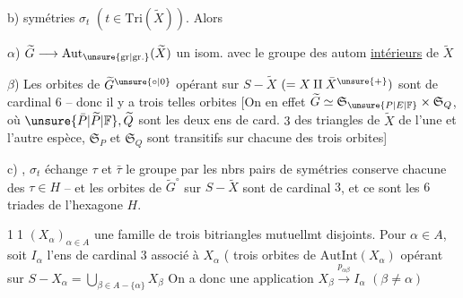 
b) 
 symétries $\sigma_t$ $(t\in\mathrm{Tri}(\widetilde X))$. Alors

$\alpha$) $\widetilde G\longrightarrow\mathrm{Aut}_{\unsure{\mathrm{gr}|\mathrm{gr.}}}(\widetilde X)$   un isom.  avec le groupe des autom \uline{intérieurs} de $\widetilde X$

$\beta$) Les orbites de $\widetilde G^{\unsure{\circ|0}}$ opérant sur $S-\widetilde X$ $(=X\amalg\bar X^{\unsure{+}})$ sont de cardinal $6$ -- donc il y  a trois telles orbites
[On  en effet $\widetilde G\simeq\mathfrak S_{\unsure{P|E|\mathbb F}}\times\mathfrak S_Q$, où $\unsure{\bar P|\widetilde P|\mathbb F},\widetilde Q$ sont les deux ens de card. $3$ des triangles de $\widetilde X$ de l'une et l'autre espèce,  $\mathfrak S_P$ et $\mathfrak S_Q$ sont  transitifs sur chacune des trois orbites]

c)  , $\sigma_t$ échange $\tau$ et $\bar\tau$  le groupe    par les nbrs pairs de symétries  conserve chacune des $\tau\in H$ -- et les orbites de $\widetilde G^\circ$ sur $S-\widetilde X$ sont de cardinal $3$, et ce sont les $6$ triades de l'hexagone $H$.

 

\textcircled{\scriptsize 11}  $(X_\alpha)_{\alpha\in A}$ une famille de trois bitriangles mutuellmt disjoints. Pour $\alpha\in A$, soit $I_\alpha$ l'ens de cardinal $3$ associé à $X_\alpha$ (  trois orbites de $\mathrm{AutInt}(X_\alpha)$ opérant sur $S-X_\alpha=\bigcup_{\beta\in A-\{\alpha\}}X_\beta$ On a donc une application $X_\beta\xrightarrow{p_{\alpha\beta}}I_\alpha$ $(\beta\ne\alpha)$
